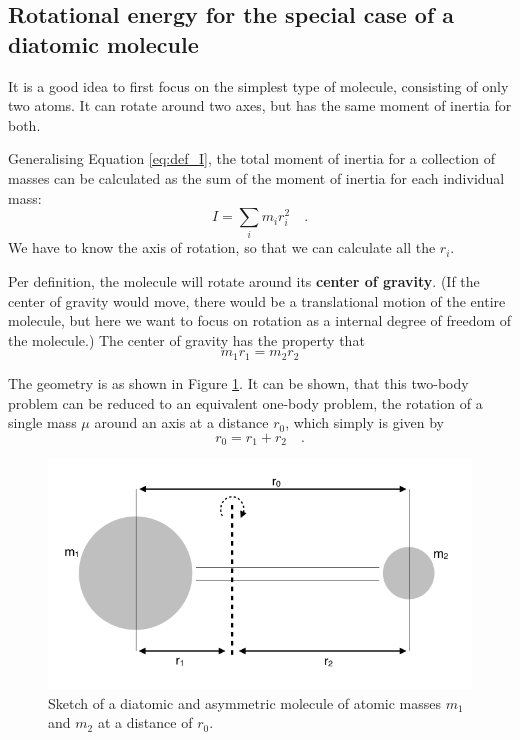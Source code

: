 \subsection{Rotational energy for the special case of a diatomic molecule}

It is a good idea to first focus on the simplest type of molecule,
consisting of only two atoms. It can rotate around two axes, but has
the same moment of inertia for both.

Generalising Equation \ref{eq:def_I}, the total moment of inertia for
a collection of masses can be calculated as the sum of the moment of
inertia for each individual mass:
\begin{equation}
  I = \sum_i m_i r_i^2 \quad .
\end{equation}
We have to know the axis of rotation, so that we can calculate all the
$r_i$.

Per definition, the molecule will rotate around its \textbf{center of
  gravity}. (If the center of gravity would move, there would be a
translational motion of the entire molecule, but here we want to focus
on rotation as a internal degree of freedom of the molecule.) The
center of gravity has the property that
\begin{equation}
m_1 r_1 = m_2 r_2
\end{equation}

The geometry is as shown in Figure \ref{fig:reduced_mass}. It can
be shown, that this two-body problem can be reduced to an equivalent
one-body problem, the rotation of a single mass $\mu$ around an axis
at a distance $r_0$, which simply is given by
\begin{equation}
  r_0 = r_1 + r_2 \quad .
\end{equation}

\begin{figure}
\begin{center}
\includegraphics[width=1\textwidth]{figures/Reduced_mass}
\caption{Sketch of a diatomic and asymmetric molecule of atomic masses $m_1$ and $m_2$ at a distance of $r_0$.}
\label{fig:reduced_mass}
\end{center}
\end{figure}


